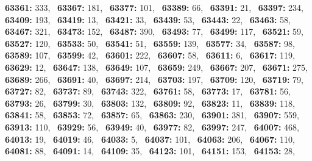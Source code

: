 \textbf{63361:} 333,\allowbreak~ 
\textbf{63367:} 181,\allowbreak~ 
\textbf{63377:} 101,\allowbreak~ 
\textbf{63389:} 66,\allowbreak~ 
\textbf{63391:} 21,\allowbreak~ 
\textbf{63397:} 234,\allowbreak~ 
\textbf{63409:} 193,\allowbreak~ 
\textbf{63419:} 13,\allowbreak~ 
\textbf{63421:} 33,\allowbreak~ 
\textbf{63439:} 53,\allowbreak~ 
\textbf{63443:} 22,\allowbreak~ 
\textbf{63463:} 58,\allowbreak~ 
\textbf{63467:} 321,\allowbreak~ 
\textbf{63473:} 152,\allowbreak~ 
\textbf{63487:} 390,\allowbreak~ 
\textbf{63493:} 77,\allowbreak~ 
\textbf{63499:} 117,\allowbreak~ 
\textbf{63521:} 59,\allowbreak~ 
\textbf{63527:} 120,\allowbreak~ 
\textbf{63533:} 50,\allowbreak~ 
\textbf{63541:} 51,\allowbreak~ 
\textbf{63559:} 139,\allowbreak~ 
\textbf{63577:} 34,\allowbreak~ 
\textbf{63587:} 98,\allowbreak~ 
\textbf{63589:} 107,\allowbreak~ 
\textbf{63599:} 42,\allowbreak~ 
\textbf{63601:} 222,\allowbreak~ 
\textbf{63607:} 58,\allowbreak~ 
\textbf{63611:} 6,\allowbreak~ 
\textbf{63617:} 119,\allowbreak~ 
\textbf{63629:} 12,\allowbreak~ 
\textbf{63647:} 138,\allowbreak~ 
\textbf{63649:} 107,\allowbreak~ 
\textbf{63659:} 249,\allowbreak~ 
\textbf{63667:} 207,\allowbreak~ 
\textbf{63671:} 275,\allowbreak~ 
\textbf{63689:} 266,\allowbreak~ 
\textbf{63691:} 40,\allowbreak~ 
\textbf{63697:} 214,\allowbreak~ 
\textbf{63703:} 197,\allowbreak~ 
\textbf{63709:} 120,\allowbreak~ 
\textbf{63719:} 79,\allowbreak~ 
\textbf{63727:} 82,\allowbreak~ 
\textbf{63737:} 89,\allowbreak~ 
\textbf{63743:} 322,\allowbreak~ 
\textbf{63761:} 58,\allowbreak~ 
\textbf{63773:} 17,\allowbreak~ 
\textbf{63781:} 56,\allowbreak~ 
\textbf{63793:} 26,\allowbreak~ 
\textbf{63799:} 30,\allowbreak~ 
\textbf{63803:} 132,\allowbreak~ 
\textbf{63809:} 92,\allowbreak~ 
\textbf{63823:} 11,\allowbreak~ 
\textbf{63839:} 118,\allowbreak~ 
\textbf{63841:} 58,\allowbreak~ 
\textbf{63853:} 72,\allowbreak~ 
\textbf{63857:} 65,\allowbreak~ 
\textbf{63863:} 230,\allowbreak~ 
\textbf{63901:} 381,\allowbreak~ 
\textbf{63907:} 559,\allowbreak~ 
\textbf{63913:} 110,\allowbreak~ 
\textbf{63929:} 56,\allowbreak~ 
\textbf{63949:} 40,\allowbreak~ 
\textbf{63977:} 82,\allowbreak~ 
\textbf{63997:} 247,\allowbreak~ 
\textbf{64007:} 468,\allowbreak~ 
\textbf{64013:} 19,\allowbreak~ 
\textbf{64019:} 46,\allowbreak~ 
\textbf{64033:} 5,\allowbreak~ 
\textbf{64037:} 101,\allowbreak~ 
\textbf{64063:} 206,\allowbreak~ 
\textbf{64067:} 110,\allowbreak~ 
\textbf{64081:} 88,\allowbreak~ 
\textbf{64091:} 14,\allowbreak~ 
\textbf{64109:} 35,\allowbreak~ 
\textbf{64123:} 101,\allowbreak~ 
\textbf{64151:} 153,\allowbreak~ 
\textbf{64153:} 28,\allowbreak~ 
